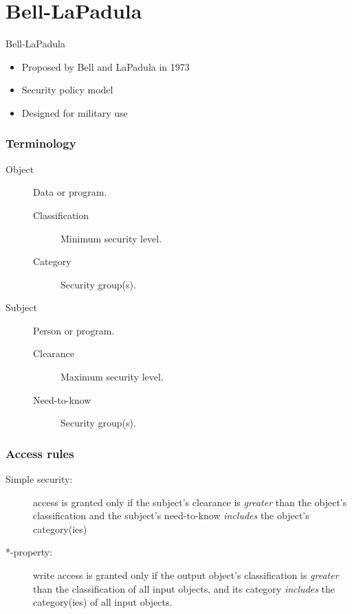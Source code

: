 \documentclass[10pt]{beamer}
\begin{document}

\section{Bell-LaPadula}

\begin{frame}{Bell-LaPadula}{}
	\begin{itemize}
		\item Proposed by Bell and LaPadula in 1973
		\item Security policy model
		\item Designed for military use
	\end{itemize}
\end{frame}

\begin{frame}
	\frametitle{Terminology}
	
	\begin{description}
		\item[Object] Data or program.
			\begin{description}
				\item[Classification] Minimum security level.
				\item[Category] Security group(s).
			\end{description}
		\item[Subject] Person or program.
			\begin{description}
				\item[Clearance] Maximum security level.
				\item[Need-to-know] Security group(s).
			\end{description}
	\end{description}
\end{frame}

\begin{frame}
	\frametitle{Access rules}
	
	\begin{description}
		\item[Simple security:] access is granted only if the subject's clearance is \textit{greater} than the object's classification and the subject's need-to-know \textit{includes} the object's category(ies)
		\item[*-property:] write access is granted only if the output object's classification is \textit{greater} than the classification of all input objects, and its category \textit{includes} the category(ies) of all input objects.
	\end{description}
\end{frame}
\end{document}
